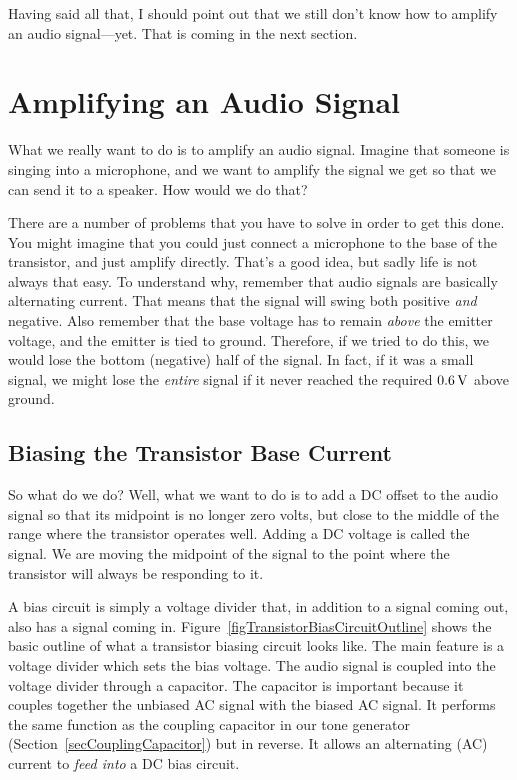 Having said all that, I should point out that we still don't know how to amplify an audio signal---yet.
That is coming in the next section.

\section{Amplifying an Audio Signal}

What we really want to do is to amplify an audio signal.
Imagine that someone is singing into a microphone, and we want to amplify the signal we get so that we can send it to a speaker.
How would we do that?

There are a number of problems that you have to solve in order to get this done.
You might imagine that you could just connect a microphone to the base of the transistor, and just amplify directly.
That's a good idea, but sadly life is not always that easy.
To understand why, remember that audio signals are basically alternating current.
That means that the signal will swing both positive \emph{and} negative.
Also remember that the base voltage has to remain \emph{above} the emitter voltage, and the emitter is tied to ground.
Therefore, if we tried to do this, we would lose the bottom (negative) half of the signal.
In fact, if it was a small signal, we might lose the \emph{entire} signal if it never reached the required $0.6\,\si{\volt}$ above ground.

\subsection{Biasing the Transistor Base Current}

So what do we do?
Well, what we want to do is to add a DC offset to the audio signal so that its midpoint is no longer zero volts, but close to the middle of the range where the transistor operates well.
Adding a DC voltage is called  the signal.
We are moving the midpoint of the signal to the point where the transistor will always be responding to it.


A bias circuit is simply a voltage divider that, in addition to a signal coming out, also has a signal coming in.
Figure~\ref{figTransistorBiasCircuitOutline} shows the basic outline of what a transistor biasing circuit looks like.
The main feature is a voltage divider which sets the bias voltage.
The audio signal is coupled into the voltage divider through a capacitor.
The capacitor is important because it couples together the unbiased AC signal with the biased AC signal. 
It performs the same function as the coupling capacitor in our tone generator (Section~\ref{secCouplingCapacitor}) but in reverse.
It allows an alternating (AC) current to \emph{feed into} a DC bias circuit.

